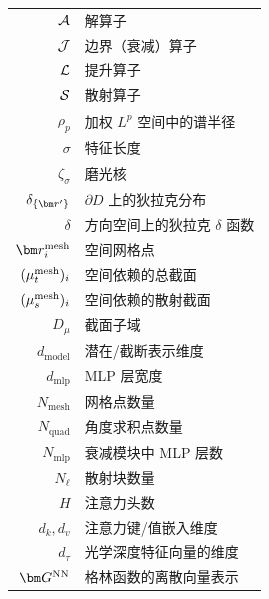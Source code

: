 \begin{nomenclature}
\begin{longtable}{rl}
        $\mathcal{A}$                     & 解算子                           \\
        $\mathcal{J}$                     & 边界（衰减）算子                      \\
        $\mathcal{L}$                    & 提升算子                          \\
        $\mathcal{S}$                    & 散射算子                          \\
        $\rho_p$                 & 加权 $L^p$ 空间中的谱半径              \\
        $\sigma$                 & 特征长度                          \\
        $\zeta_\sigma$           & 磨光核                           \\
        $\delta_{\{\br'\}}$      & $\partial D$ 上的狄拉克分布          \\
        $\delta$                 & 方向空间上的狄拉克 $\delta$ 函数         \\
        $\br^{\text{mesh}}_i$    & 空间网格点                         \\
        $(\mu_t^{\text{mesh}})_i$ & 空间依赖的总截面                      \\
        $(\mu_s^{\text{mesh}})_i$ & 空间依赖的散射截面                     \\
        $D_\mu$                  & 截面子域                          \\
        $d_{\text{model}}$       & 潜在/截断表示维度                     \\
        $d_{\text{mlp}}$         & MLP 层宽度                       \\
        $N_{\text{mesh}}$        & 网格点数量                         \\
        $N_{\text{quad}}$        & 角度求积点数量                       \\
        $N_{\text{mlp}}$         & 衰减模块中 MLP 层数                  \\
        $N_{\ell}$               & 散射块数量                         \\
        $H$                      & 注意力头数                         \\
        $d_k, d_v$               & 注意力键/值嵌入维度                    \\
        $d_{\tau}$               & 光学深度特征向量的维度                   \\
        $\bG^{\text{NN}}$        & 格林函数的离散向量表示                   \\

\end{longtable}
\end{nomenclature}
